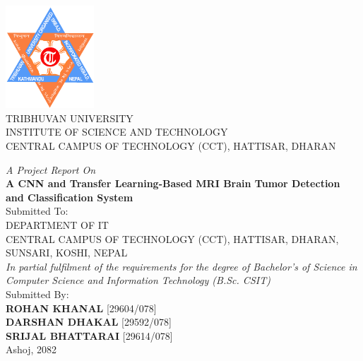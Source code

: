 
{
\centering
\normalsize

\includegraphics[width=1.3in]{Images/TUlogo.png}\\

{TRIBHUVAN UNIVERSITY}\\
{INSTITUTE OF SCIENCE AND TECHNOLOGY}\\
CENTRAL CAMPUS OF TECHNOLOGY (CCT), HATTISAR, DHARAN
\\[1.5cm]
{\textit{A Project Report On}\\
{\bf A CNN and Transfer Learning-Based MRI Brain Tumor Detection and Classification System }\\[1.5cm]

Submitted To:\\ DEPARTMENT OF IT \\ CENTRAL CAMPUS OF TECHNOLOGY (CCT),
HATTISAR, DHARAN, SUNSARI, KOSHI, NEPAL\\[1.5cm]

\textit{In partial fulfilment of the requirements for the degree of Bachelor's of Science in Computer Science and Information Technology  (B.Sc. CSIT)}\\[1.5cm]

Submitted By:\\ {\bf ROHAN KHANAL} [29604/078]\\ {\bf DARSHAN DHAKAL} [29592/078]\\ {\bf SRIJAL BHATTARAI} [29614/078]\\[3.5cm]

Ashoj, 2082

}

}

